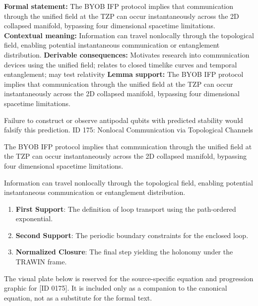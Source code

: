 \begingroup\footnotesize\setlength{\emergencystretch}{3em}\sloppy
\textbf{Formal statement:} The BYOB IFP protocol implies that communication through the unified field at the TZP can occur instantaneously across the 2D collapsed manifold, bypassing four dimensional spacetime limitations.  
\textbf{Contextual meaning:} Information can travel nonlocally through the topological field, enabling potential instantaneous communication or entanglement distribution.
\textbf{Derivable consequences:} Motivates research into communication devices using the unified field; relates to closed timelike curves and temporal entanglement; may test relativity
\textbf{Lemma support:} The BYOB IFP protocol implies that communication through the unified field at the TZP can occur instantaneously across the 2D collapsed manifold, bypassing four dimensional spacetime limitations.  \par
\endgroup

Failure to construct or observe antipodal qubits with predicted stability would falsify this prediction. ID 175: Nonlocal Communication via Topological Channels

The BYOB IFP protocol implies that communication through the unified field at the TZP can occur instantaneously across the 2D collapsed manifold, bypassing four dimensional spacetime limitations.  

Information can travel nonlocally through the topological field, enabling potential instantaneous communication or entanglement distribution.
\endgroup

\begin{enumerate}[leftmargin=1.6em,itemsep=6pt,topsep=4pt]
\item \textbf{First Support}: The definition of loop transport using the path-ordered exponential.
\item \textbf{Second Support}: The periodic boundary constraints for the enclosed loop.
\item \textbf{Normalized Closure}: The final step yielding the holonomy under the TRAWIN frame.
\end{enumerate}

\begingroup\footnotesize\sloppy
The visual plate below is reserved for the source-specific equation and progression graphic for [ID 0175]. It is included only as a companion to the canonical equation, not as a substitute for the formal text.
\par\endgroup
\ifTZPDarkEdition
{}
\fi

